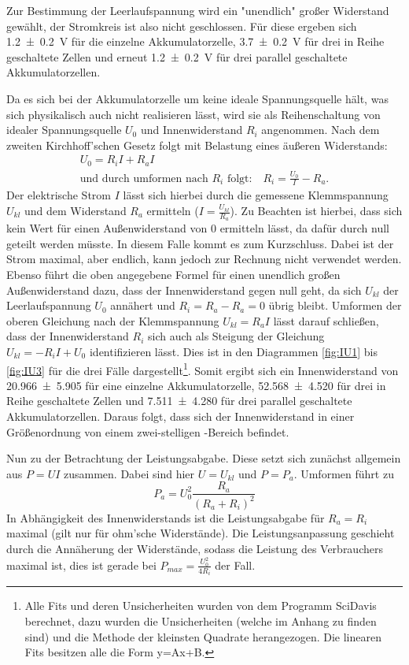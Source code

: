 Zur Bestimmung der Leerlaufspannung wird ein "unendlich" großer Widerstand gewählt, der Stromkreis ist also nicht geschlossen.
Für diese ergeben sich \SI{1,2+-0,2}{V} für die einzelne Akkumulatorzelle, \SI{3,7+-0,2}{V} für drei in Reihe geschaltete Zellen und erneut \SI{1,2+-0,2}{V} für drei parallel geschaltete Akkumulatorzellen. 

Da es sich bei der Akkumulatorzelle um keine ideale Spannungsquelle hält, was sich physikalisch auch nicht realisieren lässt, wird sie als Reihenschaltung von idealer Spannungsquelle $U_0$ und Innenwiderstand $R_i$ angenommen. 
Nach dem zweiten Kirchhoff'schen Gesetz folgt mit Belastung eines äußeren Widerstands:
\begin{align}
	U_0 = R_i I + R_a I \\
	\text{und durch umformen nach $R_i$ folgt:} \quad R_i = \frac{U_0}{I}-R_a.
\end{align}
Der elektrische Strom $I$ lässt sich hierbei durch die gemessene Klemmspannung $U_{kl}$ und dem Widerstand $R_a$ ermitteln ($I=\frac{U_{kl}}{R_a}$).
Zu Beachten ist hierbei, dass sich kein Wert für einen Außenwiderstand von \SI{0}{\Omega} ermitteln lässt, da dafür durch null geteilt werden müsste.
In diesem Falle kommt es zum Kurzschluss.
Dabei ist der Strom maximal, aber endlich, kann jedoch zur Rechnung nicht verwendet werden.
Ebenso führt die oben angegebene Formel für einen unendlich großen Außenwiderstand dazu, dass der Innenwiderstand gegen null geht, da sich $U_{kl}$ der Leerlaufspannung $U_0$ annähert und $R_i = R_a - R_a = 0$ übrig bleibt.
Umformen der oberen Gleichung nach der Klemmspannung $U_{kl} = R_a I$ lässt darauf schließen, dass der Innenwiderstand $R_i$ sich auch als Steigung der Gleichung $U_{kl} = -R_i I + U_0$ identifizieren lässt. Dies ist in den Diagrammen \ref{fig:IU1} bis \ref{fig:IU3} für die drei Fälle dargestellt\footnote{Alle Fits und deren Unsicherheiten wurden von dem Programm SciDavis berechnet, dazu wurden die Unsicherheiten (welche im Anhang zu finden sind) und die Methode der kleinsten Quadrate herangezogen. Die linearen Fits besitzen alle die Form y=Ax+B.}.
Somit ergibt sich ein Innenwiderstand von \SI{20,966+-5,905}{\Omega} für eine einzelne Akkumulatorzelle, \SI{52,568+-4,520}{\Omega} für drei in Reihe geschaltete Zellen und \SI{7,511+-4,280}{\Omega} für drei parallel geschaltete Akkumulatorzellen. 
Daraus folgt, dass sich der Innenwiderstand in einer Größenordnung von einem zwei-stelligen \si{\Omega}-Bereich befindet. 

Nun zu der Betrachtung der Leistungsabgabe.
Diese setzt sich zunächst allgemein aus $P = UI$ zusammen. 
Dabei sind hier $U = U_{kl}$ und $P=P_a$.
Umformen führt zu
\begin{equation}
	P_a = U_0^2\frac{R_a}{(R_a+R_i)^2}
\end{equation}
In Abhängigkeit des Innenwiderstands ist die Leistungsabgabe für $R_a = R_i$ maximal (gilt nur für ohm'sche Widerstände). 
Die Leistungsanpassung geschieht durch die Annäherung der Widerstände, sodass die Leistung des Verbrauchers maximal ist, dies ist gerade bei $P_{max} = \frac{U_0^2}{4R_i}$ der Fall.

